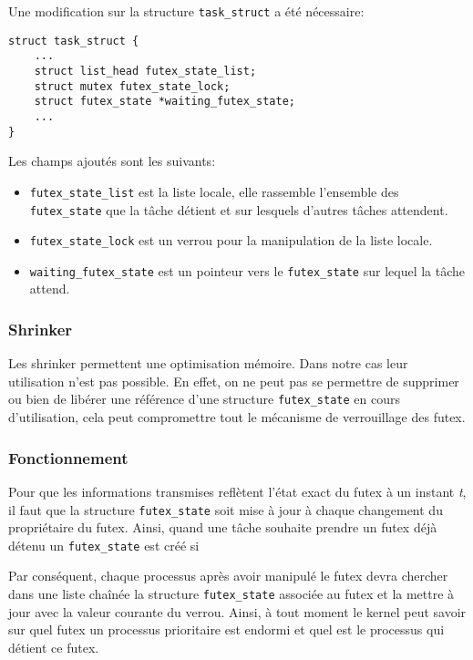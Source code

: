 Une modification sur la structure \verb|task_struct| a été nécessaire:

\begin{lstlisting}
struct task_struct {
	...
	struct list_head futex_state_list;
	struct mutex futex_state_lock;
	struct futex_state *waiting_futex_state;
	...
}
\end{lstlisting}

Les champs ajoutés sont les suivants:
\begin{itemize}
	\item \verb|futex_state_list| est la liste locale, elle rassemble l'ensemble des
	\verb|futex_state| que la tâche détient et sur lesquels d'autres tâches attendent.
	
	\item \verb|futex_state_lock| est un verrou pour la manipulation de la liste locale.
	
	\item \verb|waiting_futex_state| est un pointeur vers le \verb|futex_state| sur lequel
	la tâche attend.
\end{itemize}

\subsubsection{Shrinker}

Les shrinker permettent une optimisation mémoire.
Dans notre cas leur utilisation n'est pas possible. En effet, on ne peut pas se permettre de supprimer ou bien de libérer une référence d'une structure \verb|futex_state| en cours d'utilisation, cela peut compromettre tout le mécanisme de verrouillage des futex.


\subsubsection{Fonctionnement}

Pour que les informations transmises reflètent l'état exact du futex
à un instant \textit{t}, il faut que la structure \verb|futex_state| soit mise à jour
à chaque changement du propriétaire du futex.
Ainsi, quand une tâche souhaite prendre un futex déjà détenu un \verb|futex_state|
est créé si

Par conséquent, chaque processus après avoir manipulé le futex 
devra chercher dans une liste chaînée la structure \verb|futex_state| associée au 
futex et la mettre à jour avec la valeur courante du verrou. Ainsi, à tout moment 
le kernel peut savoir sur quel futex un processus prioritaire est endormi et quel
est le processus qui détient ce futex.
